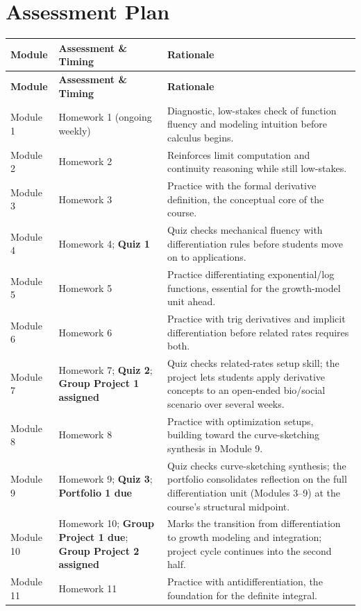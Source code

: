\documentclass{article}
\begin{document}
\section{Assessment Plan}
\begin{longtable}{p{2.2cm} p{6.3cm} p{6cm}}
\toprule
\textbf{Module} & \textbf{Assessment \& Timing} & \textbf{Rationale} \\
\midrule
\endfirsthead
\toprule
\textbf{Module} & \textbf{Assessment \& Timing} & \textbf{Rationale} \\
\midrule
\endhead
\bottomrule
\endfoot
Module 1 & Homework 1 (ongoing weekly) & Diagnostic, low-stakes check of function fluency and modeling intuition before calculus begins. \\
Module 2 & Homework 2 & Reinforces limit computation and continuity reasoning while still low-stakes. \\
Module 3 & Homework 3 & Practice with the formal derivative definition, the conceptual core of the course. \\
Module 4 & Homework 4; \textbf{Quiz 1} & Quiz checks mechanical fluency with differentiation rules before students move on to applications. \\
Module 5 & Homework 5 & Practice differentiating exponential/log functions, essential for the growth-model unit ahead. \\
Module 6 & Homework 6 & Practice with trig derivatives and implicit differentiation before related rates requires both. \\
Module 7 & Homework 7; \textbf{Quiz 2}; \textbf{Group Project 1 assigned} & Quiz checks related-rates setup skill; the project lets students apply derivative concepts to an open-ended bio/social scenario over several weeks. \\
Module 8 & Homework 8 & Practice with optimization setups, building toward the curve-sketching synthesis in Module 9. \\
Module 9 & Homework 9; \textbf{Quiz 3}; \textbf{Portfolio 1 due} & Quiz checks curve-sketching synthesis; the portfolio consolidates reflection on the full differentiation unit (Modules 3--9) at the course's structural midpoint. \\
Module 10 & Homework 10; \textbf{Group Project 1 due}; \textbf{Group Project 2 assigned} & Marks the transition from differentiation to growth modeling and integration; project cycle continues into the second half. \\
Module 11 & Homework 11 & Practice with antidifferentiation, the foundation for the definite integral. \\

\end{longtable}
\end{document}
